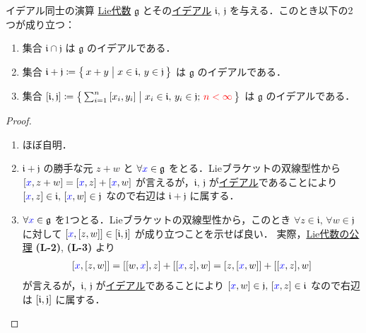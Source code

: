 \documentclass[rep_main]{subfiles}
\begin{document}
\begin{mylem}[label=lem:ideal-LieAlg]{イデアル同士の演算}
    \hyperref[ax:LieAlg]{Lie代数} $\mathfrak{g}$ とその\hyperref[def:ideal-LieAlg]{イデアル} $\mathfrak{i},\, \mathfrak{j}$ を与える．このとき以下の2つが成り立つ：
    \begin{enumerate}
        \item 集合 $\mathfrak{i} \cap \mathfrak{j}$ は $\mathfrak{g}$ のイデアルである．
        \item 集合 $\mathfrak{i} + \mathfrak{j} \coloneqq \bigl\{\, x + y \bigm| x \in \mathfrak{i},\, y \in \mathfrak{j} \,\bigr\}$ は $\mathfrak{g}$ のイデアルである．
        \item 集合 $\comm{\mathfrak{i}}{\mathfrak{j}} \coloneqq \bigl\{\, \sum_{i=1}^n \comm{x_i}{y_i} \bigm| x_i \in \mathfrak{i},\, y_i \in \mathfrak{j};\, \textcolor{red}{n < \infty} \,\bigr\}$ は $\mathfrak{g}$ のイデアルである．
    \end{enumerate}
\end{mylem}

\begin{proof}
    \begin{enumerate}
        \item ほぼ自明．
        \item $\mathfrak{i} + \mathfrak{j}$ の勝手な元 $z + w$ と $\forall \textcolor{blue}{x} \in \mathfrak{g}$ をとる．Lieブラケットの双線型性から $\comm{\textcolor{blue}{x}}{z + w} = \comm{\textcolor{blue}{x}}{z} + \comm{\textcolor{blue}{x}}{w}$ が言えるが，$\mathfrak{i},\, \mathfrak{j}$ が\hyperref[def:ideal-LieAlg]{イデアル}であることにより $\comm{\textcolor{blue}{x}}{z} \in \mathfrak{i},\, \comm{\textcolor{blue}{x}}{w} \in \mathfrak{j}$ なので右辺は $\mathfrak{i} + \mathfrak{j}$ に属する．
        \item $\forall \textcolor{blue}{x} \in \mathfrak{g}$ を1つとる．Lieブラケットの双線型性から，このとき $\forall z \in \mathfrak{i},\, \forall w \in \mathfrak{j}$ に対して $\comm{\textcolor{blue}{x}}{\comm{z}{w}} \in \comm{\mathfrak{i}}{\mathfrak{j}}$ が成り立つことを示せば良い．
        実際，\hyperref[ax:LieAlg]{Lie代数の公理} \textsf{\textbf{(L-2)}}, \textsf{\textbf{(L-3)}} より
        \begin{align}
            \comm{\textcolor{blue}{x}}{\comm{z}{w}} = \comm{\comm{w}{\textcolor{blue}{x}}}{z} + \comm{\comm{\textcolor{blue}{x}}{z}}{w} = \comm{z}{\comm{\textcolor{blue}{x}}{w}} + \comm{\comm{\textcolor{blue}{x}}{z}}{w}
        \end{align}
        が言えるが，$\mathfrak{i},\, \mathfrak{j}$ が\hyperref[def:ideal-LieAlg]{イデアル}であることにより $\comm{\textcolor{blue}{x}}{w} \in \mathfrak{j},\, \comm{\textcolor{blue}{x}}{z} \in \mathfrak{i}$ なので右辺は $\comm{\mathfrak{i}}{\mathfrak{j}}$ に属する．
    \end{enumerate}
    
\end{proof}
\end{document}
